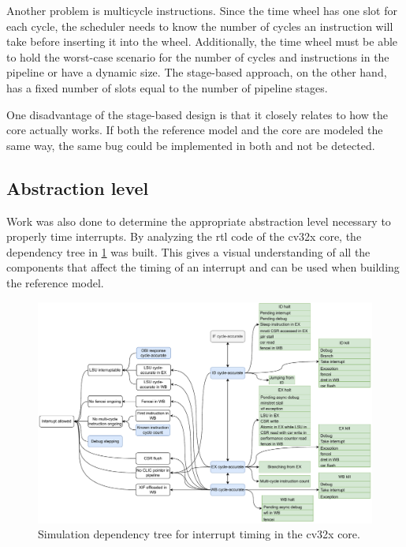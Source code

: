 Another problem is multicycle instructions. Since the time wheel has one slot for each cycle, the scheduler needs to know the number of cycles an instruction will take before inserting it into the wheel. Additionally, the time wheel must be able to hold the worst-case scenario for the number of cycles and instructions in the pipeline or have a dynamic size. The stage-based approach, on the other hand, has a fixed number of slots equal to the number of pipeline stages. 

One disadvantage of the stage-based design is that it closely relates to how the core actually works. If both the reference model and the core are modeled the same way, the same bug could be implemented in both and not be detected.


\subsection{Abstraction level}

Work was also done to determine the appropriate abstraction level necessary to properly time interrupts. By analyzing the \acrshort{rtl} code of the \gls{cv32x} core, the dependency tree in \cref{fig:dependency-tree-cv32x} was built. This gives a visual understanding of all the components that affect the timing of an interrupt and can be used when building the reference model.

\begin{figure}[htb]
    \centering
    \includegraphics[width=1.0\linewidth]{figures/dependency_tree_full.pdf}
    \caption{Simulation dependency tree for interrupt timing in the \gls{cv32x} core.}
    \label{fig:dependency-tree-cv32x}
\end{figure}

